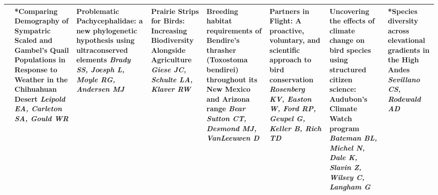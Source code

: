 \begin{tabular}{|x{0.85cm}|x{2.85cm}|x{2.85cm}|x{2.85cm}|x{2.85cm}|a{2.85cm}|a{2.85cm}|a{2.85cm}|}
&*Comparing Demography of Sympatric Scaled and Gambel's Quail Populations in Response to Weather in the Chihuahuan Desert \newline \newline \textit{Leipold EA, Carleton SA, Gould WR} & Problematic Pachycephalidae: a new phylogenetic hypothesis using ultraconserved elements \newline \newline \textit{Brady SS, Joesph L, Moyle RG, Andersen MJ} & Prairie Strips for Birds: Increasing Biodiversity Alongside Agriculture \newline \newline \textit{Giese JC, Schulte LA, Klaver RW} & Breeding habitat requirements of Bendire's thrasher (Toxostoma bendirei) throughout its New Mexico and Arizona range \newline \newline \textit{Bear Sutton CT, Desmond MJ, VanLeeuwen D} & Partners in Flight: A proactive, voluntary, and scientific approach to bird conservation \newline \newline \textit{Rosenberg KV, Easton W, Ford RP, Geupel G, Keller B, Rich TD} & Uncovering the effects of climate change on bird species using structured citizen science: Audubon's Climate Watch program \newline \newline \textit{Bateman BL, Michel N, Dale K, Slavin Z, Wilsey C, Langham G} & *Species diversity across elevational gradients in the High Andes \newline \newline \textit{Sevillano CS, Rodewald AD}\\
\hline

\end{tabular}
